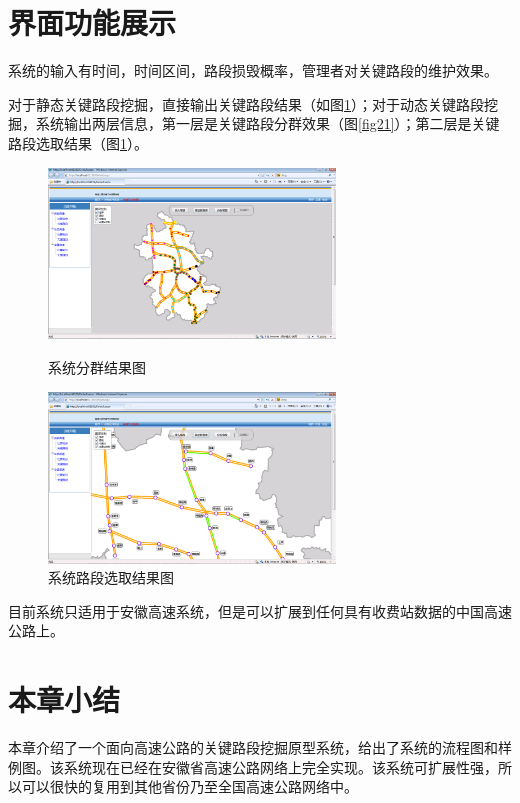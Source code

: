 		
	\section{界面功能展示}

		系统的输入有时间，时间区间，路段损毁概率，管理者对关键路段的维护效果。

		对于静态关键路段挖掘，直接输出关键路段结果（如图\ref{fig22}）；对于动态关键路段挖掘，系统输出两层信息，第一层是关键路段分群效果（图\ref{fig21}）；第二层是关键路段选取结果（图\ref{fig22}）。

				\begin{figure}[h]
				\begin{minipage}{0.5\linewidth}
					\centering
					\includegraphics[width=3.0in]{picture/yuanxing1}
					\caption{系统分群结果图}
					\label{fig21}
				\end{minipage}%
				\begin{minipage}{0.5\linewidth}
					\centering
					\includegraphics[width=3.0in]{picture/yuanxing2}
					\caption{系统路段选取结果图}
					\label{fig22}
				\end{minipage}
				\end{figure}



		目前系统只适用于安徽高速系统，但是可以扩展到任何具有收费站数据的中国高速公路上。

	\section{本章小结}
		本章介绍了一个面向高速公路的关键路段挖掘原型系统，给出了系统的流程图和样例图。该系统现在已经在安徽省高速公路网络上完全实现。该系统可扩展性强，所以可以很快的复用到其他省份乃至全国高速公路网络中。

	